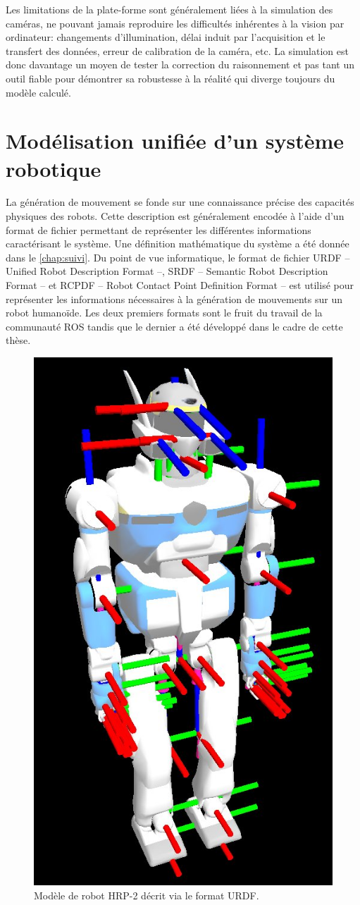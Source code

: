 Les limitations de la plate-forme sont généralement liées à la
simulation des caméras, ne pouvant jamais reproduire les difficultés
inhérentes à la vision par ordinateur: changements d'illumination,
délai induit par l'acquisition et le transfert des données, erreur de
calibration de la caméra, etc. La simulation est donc davantage un
moyen de tester la correction du raisonnement et pas tant un outil
fiable pour démontrer sa robustesse à la réalité qui diverge toujours
du modèle calculé.


\section{Modélisation unifiée d'un système robotique}


La génération de mouvement se fonde sur une connaissance précise des
capacités physiques des robots. Cette description est généralement
encodée à l'aide d'un format de fichier permettant de représenter les
différentes informations caractérisant le système. Une définition
mathématique du système a été donnée dans le \autoref{chap:suivi}. Du
point de vue informatique, le format de fichier URDF -- Unified Robot
Description Format --,
SRDF -- Semantic Robot Description Format -- et RCPDF -- Robot Contact Point
Definition Format -- est utilisé pour représenter les informations nécessaires à
la génération de mouvements sur un robot humanoïde. Les deux premiers
formats sont le fruit du travail de la communauté ROS tandis que le
dernier a été développé dans le cadre de cette thèse.

\begin{figure}
  \begin{center}
    \includegraphics[width=.45\linewidth]{src/chap4-integration/hrp2_urdf.jpg}
  \end{center}
  \caption{Modèle de robot HRP-2 décrit via le format URDF.}
\end{figure}



